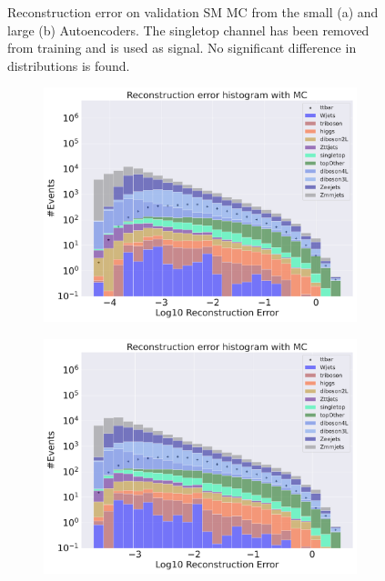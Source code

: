 \begin{figure}[H]
\begin{subfigure}{.45\textwidth}
        \caption{ }
        \label{fig:ae_big_singletop}
    \end{subfigure}
    \hfill
    \caption[AE | Reconstruction error using Singletop channel as signal]{Reconstruction error on validation SM MC from the small (a) and large (b) Autoencoders. The singletop channel has been removed from training and 
    is used as signal. No significant difference in distributions is found.  } 
    \label{fig:ae_big_channel_2}
\end{figure}

\begin{figure}[H]
    \centering
    \begin{subfigure}{.45\textwidth}
        \includegraphics[width=\textwidth]{Figures/AE_testing/small/b_data_recon_big_rm3_feats_sig_ttbar.pdf}
        \caption{}
        \label{fig:ae_small_ttbar}
    \end{subfigure}
    \hfill 
    \begin{subfigure}{.45\textwidth}
        \includegraphics[width=\textwidth]{Figures/AE_testing/big/b_data_recon_big_rm3_feats_sig_ttbar.pdf}

\end{subfigure}
\end{figure}
